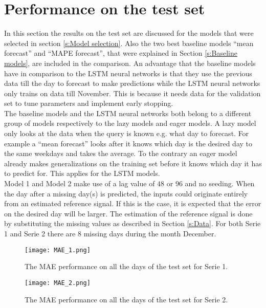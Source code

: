 \section{Performance on the test set}
In this section the results on the test set are discussed for the models that were selected in section \ref{s:Model selection}. 
Also the two best baseline models ``mean forecast'' and ``MAPE forecast'', that were explained in Section \ref{s:Baseline models}, are included in the comparison. An advantage that the baseline models have in comparison to the LSTM neural networks is that they use the previous data till the day to forecast to make predictions while the LSTM neural networks only trains on data till November. This is because it needs data for the validation set to tune parameters and implement early stopping. \\
The baseline models and the LSTM neural networks both belong to a different group of models respectively to the lazy models and eager models. A lazy model only looks at the data when the query is known e.g. what day to forecast. For example a ``mean forecast'' looks after it knows which day is the desired day to the same weekdays and takes the average. To the contrary an eager model already makes generalizations on the training set before it knows which day it has to predict for. This applies for the LSTM models.\\

Model 1 and Model 2 make use of a lag value of $ 48 $ or $ 96 $ and no seeding. When the day after a missing day(s) is predicted, the inputs could originate entirely from an estimated reference signal. If this is the case, it is expected that the error on the desired day will be larger. The estimation of the reference signal is done by substituting the missing values as described in Section \ref{s:Data}. For both Serie 1 and Serie 2 there are $ 8 $ missing days during the month December.

\begin{figure}[h]
	\centering
	\texttt{[image: MAE\_1.png]}
	\caption{The MAE performance on all the days of the test set for Serie 1.}
	\label{fig:MAE_serie1}
\end{figure}

\begin{figure}[h]
	\centering
	\texttt{[image: MAE\_2.png]}
	\caption{The MAE performance on all the days of the test set for Serie 2.}
	\label{fig:MAE_serie2}
\end{figure}	

